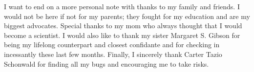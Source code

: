 I want to end on a more personal note with thanks to my family and friends. I would not be here if not for my parents; they fought for my education and are my biggest advocates. Special thanks to my mom who always thought that I would become a scientist. I would also like to thank my sister Margaret S. Gibson for being my lifelong counterpart and closest confidante and for checking in incessantly these last few months. Finally, I sincerely thank Carter Tazio Schonwald for finding all my bugs and encouraging me to take risks.


